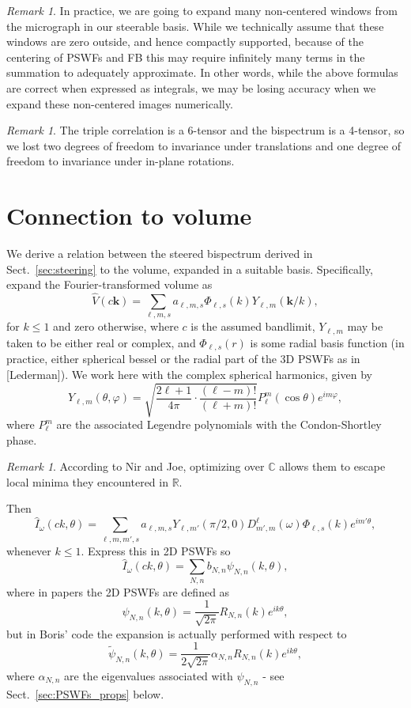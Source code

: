 \documentclass{amsart}
\theoremstyle{definition}
\theoremstyle{remark}
\newtheorem{remark}[theorem]{Remark}
\numberwithin{equation}{section}
\newcommand{\kk}{\mathbf{k}}
\newcommand{\RR}{\mathbb{R}}
\begin{document}
\begin{remark}
In practice, we are going to expand many non-centered windows from the micrograph in our steerable basis. While we technically assume that these windows are zero outside, and hence compactly supported, because of the centering of PSWFs and FB this may require infinitely many terms in the summation to adequately approximate. In other words, while the above formulas are correct when expressed as integrals, we may be losing accuracy when we expand these non-centered images numerically.
\end{remark}

\begin{remark}
The triple correlation is a 6-tensor and the bispectrum is a 4-tensor, so we lost two degrees of freedom to invariance under translations and one degree of freedom to invariance under in-plane rotations.
\end{remark}

\section{Connection to volume}

We derive a relation between the steered bispectrum derived in Sect.~\ref{sec:steering} to the volume, expanded in a suitable basis. Specifically, expand the Fourier-transformed volume as
\[ \widehat V(c\kk) = \sum_{\ell,m,s}a_{\ell,m,s}\Phi_{\ell,s}(k)Y_{\ell,m}(\kk/k),\]
for $k\leq 1$ and zero otherwise, where $c$ is the assumed bandlimit, $Y_{\ell,m}$ may be taken to be either real or complex, and $\Phi_{\ell,s}(r)$ is some radial basis function (in practice, either spherical bessel or the radial part of the 3D PSWFs as in [Lederman]). We work here with the complex spherical harmonics, given by
\[ Y_{\ell,m}(\theta,\varphi) = \sqrt{\frac{2\ell+1}{4\pi}\cdot\frac{(\ell-m)!}{(\ell+m)!}}P_{\ell}^m(\cos\theta)e^{i m\varphi},\]
where $P_{\ell}^m$ are the associated Legendre polynomials with the Condon-Shortley phase. 
\begin{remark}
According to Nir and Joe, optimizing over $\mathbb{C}$ allows them to escape local minima they encountered in $\RR$.
\end{remark}

Then
\[ \widehat I_{\omega}(ck,\theta) = \sum_{\ell,m,m',s}a_{\ell,m,s}Y_{\ell,m'}(\pi/2,0)D_{m',m}^{\ell}(\omega)\Phi_{\ell,s}(k)e^{im'\theta},\]
whenever $k\leq 1$. Express this in 2D PSWFs so
\[ \widehat I_{\omega}(ck,\theta) = \sum_{N,n}b_{N,n}\psi_{N,n}(k,\theta),\]
where in papers the 2D PSWFs are defined as
\[ \psi_{N,n}(k,\theta) = \frac{1}{\sqrt{2\pi}}R_{N,n}(k)e^{ik\theta},\]
but in Boris' code the expansion is actually performed with respect to
\[ \widetilde\psi_{N,n}(k,\theta) = \frac{1}{2\sqrt{2\pi}}\alpha_{N,n}R_{N,n}(k)e^{ik\theta},\]
where $\alpha_{N,n}$ are the eigenvalues associated with $\psi_{N,n}$ - see Sect.~\ref{sec:PSWFs_props} below. 
\end{document}

